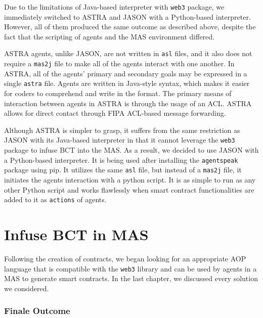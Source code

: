 \vspace{.5cm}

Due to the limitations of Java-based interpreter with \texttt{web3} package, we immediately switched to \ac{ASTRA} and JASON with a Python-based interpreter. However, all of them produced the same outcome as described above, despite the fact that the scripting of agents and the \ac{MAS} environment differed.

\vspace{.5cm}

\ac{ASTRA} agents, unlike JASON, are not written in \texttt{asl} files, and it also does not require a \texttt{mas2j} file to make all of the agents interact with one another. In \ac{ASTRA}, all of the agents' primary and secondary goals may be expressed in a single \texttt{astra} file. Agents are written in Java-style syntax, which makes it easier for coders to comprehend and write in the format. The primary means of interaction between agents in \ac{ASTRA} is through the usage of an \ac{ACL}. \ac{ASTRA} allows for direct contact through \ac{FIPA} \ac{ACL}-based message forwarding.

\vspace{.5cm}

Although \ac{ASTRA} is simpler to grasp, it suffers from the same restriction as JASON with its Java-based interpreter in that it cannot leverage the \texttt{web3} package to infuse \ac{BCT} into the \ac{MAS}. As a result, we decided to use JASON with a Python-based interpreter. It is being used after installing the \texttt{agentspeak} package using \ac{pip}. It utilizes the same \texttt{asl} file, but instead of a \texttt{mas2j} file, it initiates the agents interaction with a python script. It is as simple to run as any other Python script and works flawlessly when smart contract functionalities are added to it as \texttt{actions} of agents.

\section{Infuse BCT in MAS}

Following the creation of contracts, we began looking for an appropriate \ac{AOP} language that is compatible with the \texttt{web3} library and can be used by agents in a \ac{MAS} to generate smart contracts. In the last chapter, we discussed every solution we considered. 

\subsubsection{Finale Outcome}

